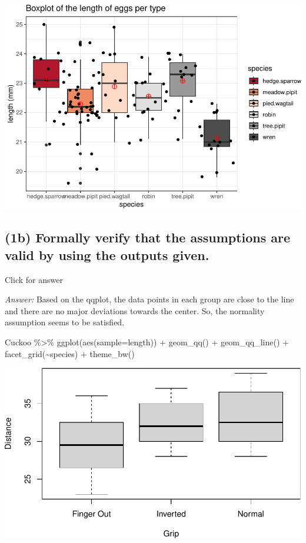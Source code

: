 \documentclass[
]{book}
\newenvironment{Shaded}{\begin{snugshade}}{\end{snugshade}}
\newcommand{\AttributeTok}[1]{\textcolor[rgb]{0.77,0.63,0.00}{#1}}
\newcommand{\FunctionTok}[1]{\textcolor[rgb]{0.00,0.00,0.00}{#1}}
\newcommand{\NormalTok}[1]{#1}
\newcommand{\SpecialCharTok}[1]{\textcolor[rgb]{0.00,0.00,0.00}{#1}}
\begin{document}
\includegraphics[width=1\linewidth]{Class_Activity_23_files/figure-latex/unnamed-chunk-2-1}

\hypertarget{b-formally-verify-that-the-assumptions-are-valid-by-using-the-outputs-given.}{%
\subsection{(1b) Formally verify that the assumptions are valid by using the outputs given.}\label{b-formally-verify-that-the-assumptions-are-valid-by-using-the-outputs-given.}}

Click for answer

\emph{Answer:} Based on the qqplot, the data points in each group are close to the line and there are no major deviations towards the center. So, the normality assumption seems to be satisfied.

\begin{Shaded}
\begin{Highlighting}[]
\NormalTok{Cuckoo }\SpecialCharTok{\%\textgreater{}\%} 
  \FunctionTok{ggplot}\NormalTok{(}\FunctionTok{aes}\NormalTok{(}\AttributeTok{sample=}\NormalTok{length)) }\SpecialCharTok{+} \FunctionTok{geom\_qq}\NormalTok{() }\SpecialCharTok{+} \FunctionTok{geom\_qq\_line}\NormalTok{() }\SpecialCharTok{+} \FunctionTok{facet\_grid}\NormalTok{(}\SpecialCharTok{\textasciitilde{}}\NormalTok{species) }\SpecialCharTok{+}  \FunctionTok{theme\_bw}\NormalTok{() }
\end{Highlighting}
\end{Shaded}

\includegraphics[width=1\linewidth]{Class_Activity_23_files/figure-latex/unnamed-chunk-3-1}
\end{document}
